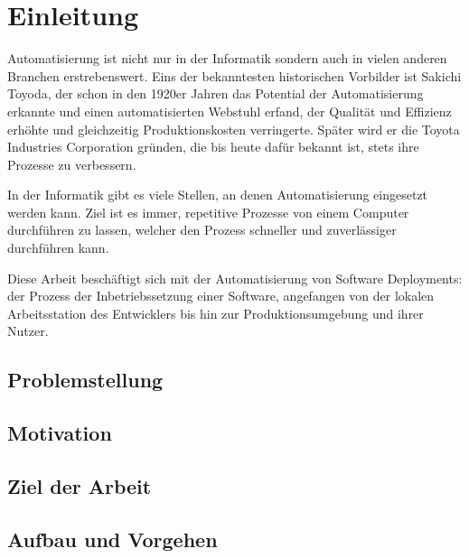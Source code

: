 
\chapter{Einleitung}

Automatisierung ist nicht nur in der Informatik sondern auch in vielen anderen Branchen erstrebenswert. Eins der bekanntesten historischen Vorbilder ist Sakichi Toyoda, der schon in den 1920er Jahren das Potential der Automatisierung erkannte und einen automatisierten Webstuhl erfand, der Qualität und Effizienz erhöhte und gleichzeitig Produktionskosten verringerte. Später wird er die Toyota Industries Corporation gründen, die bis heute dafür bekannt ist, stets ihre Prozesse zu verbessern.

In der Informatik gibt es viele Stellen, an denen Automatisierung eingesetzt werden kann. Ziel ist es immer, repetitive Prozesse von einem Computer durchführen zu lassen, welcher den Prozess schneller und zuverlässiger durchführen kann.

Diese Arbeit beschäftigt sich mit der Automatisierung von Software Deployments: der Prozess der Inbetriebssetzung einer Software, angefangen von der lokalen Arbeitsstation des Entwicklers bis hin zur Produktionsumgebung und ihrer Nutzer.


\section{Problemstellung}


\section{Motivation}


\section{Ziel der Arbeit}


\section{Aufbau und Vorgehen}

